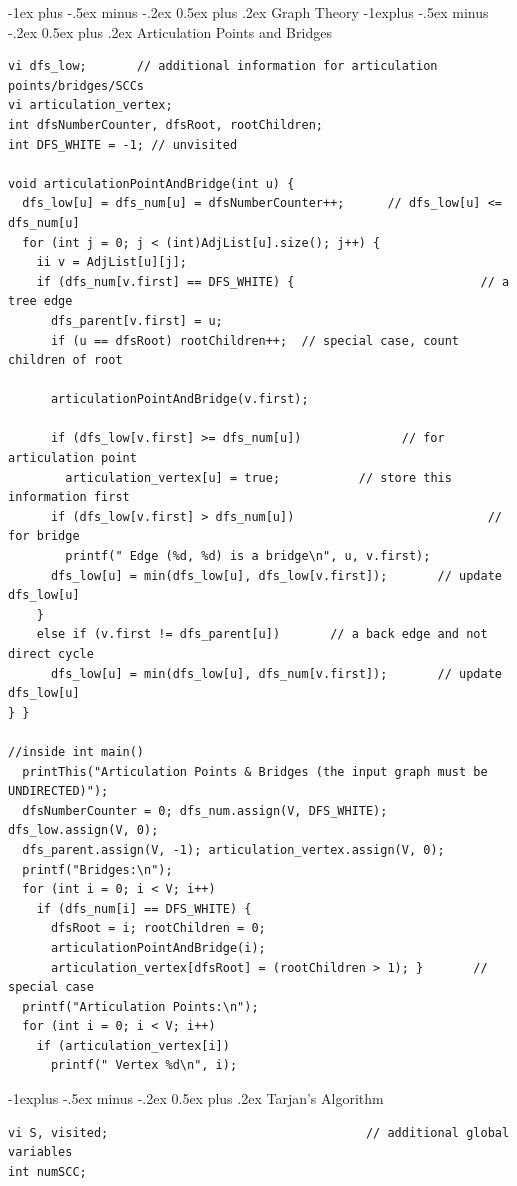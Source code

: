 \documentclass[10pt,landscape]{article}
\makeatletter
\renewcommand{\section}{\@startsection{section}{1}{0mm}%
                                {-1ex plus -.5ex minus -.2ex}%
                                {0.5ex plus .2ex}%
                                {\normalfont\large\bfseries}}
\renewcommand{\subsection}{\@startsection{subsection}{2}{0mm}%
                                {-1explus -.5ex minus -.2ex}%
                                {0.5ex plus .2ex}%
                                {\normalfont\normalsize\bfseries}}
\makeatother
\begin{document}
\begin{multicols}{2}
\section{Graph Theory}
\subsection{Articulation Points and Bridges}
\begin{lstlisting}
vi dfs_low;       // additional information for articulation points/bridges/SCCs
vi articulation_vertex;
int dfsNumberCounter, dfsRoot, rootChildren;
int DFS_WHITE = -1; // unvisited

void articulationPointAndBridge(int u) {
  dfs_low[u] = dfs_num[u] = dfsNumberCounter++;      // dfs_low[u] <= dfs_num[u]
  for (int j = 0; j < (int)AdjList[u].size(); j++) {
    ii v = AdjList[u][j];
    if (dfs_num[v.first] == DFS_WHITE) {                          // a tree edge
      dfs_parent[v.first] = u;
      if (u == dfsRoot) rootChildren++;  // special case, count children of root

      articulationPointAndBridge(v.first);

      if (dfs_low[v.first] >= dfs_num[u])              // for articulation point
        articulation_vertex[u] = true;           // store this information first
      if (dfs_low[v.first] > dfs_num[u])                           // for bridge
        printf(" Edge (%d, %d) is a bridge\n", u, v.first);
      dfs_low[u] = min(dfs_low[u], dfs_low[v.first]);       // update dfs_low[u]
    }
    else if (v.first != dfs_parent[u])       // a back edge and not direct cycle
      dfs_low[u] = min(dfs_low[u], dfs_num[v.first]);       // update dfs_low[u]
} }

//inside int main()
  printThis("Articulation Points & Bridges (the input graph must be UNDIRECTED)");
  dfsNumberCounter = 0; dfs_num.assign(V, DFS_WHITE); dfs_low.assign(V, 0);
  dfs_parent.assign(V, -1); articulation_vertex.assign(V, 0);
  printf("Bridges:\n");
  for (int i = 0; i < V; i++)
    if (dfs_num[i] == DFS_WHITE) {
      dfsRoot = i; rootChildren = 0;
      articulationPointAndBridge(i);
      articulation_vertex[dfsRoot] = (rootChildren > 1); }       // special case
  printf("Articulation Points:\n");
  for (int i = 0; i < V; i++)
    if (articulation_vertex[i])
      printf(" Vertex %d\n", i);
\end{lstlisting}

\subsection{Tarjan's Algorithm}
\begin{lstlisting}
vi S, visited;                                    // additional global variables
int numSCC;


\end{lstlisting}
\end{multicols}
\end{document}
